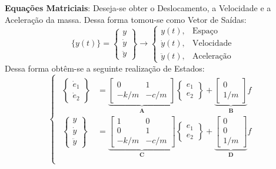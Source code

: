 \documentclass{article}
\begin{document}
\begin{resolution}
    \textbf{Equações Matriciais}: Deseja-se obter o Deslocamento, a Velocidade e a Aceleração da massa. Dessa forma tomou-se como Vetor de Saídas:
    \begin{equation*}
        \lbrace y(t) \rbrace = \begin{Bmatrix} y\\ \dot{y}\\ \ddot{y} \end{Bmatrix} 
        \to \begin{cases} y(t), &\text{Espaço}\\ \dot{y}(t),&\text{Velocidade}\\ \ddot{y}(t),&\text{Aceleração} \end{cases}
    \end{equation*}
    Dessa forma obtêm-se a seguinte realização de Estados:
    \begin{equation}
        \begin{cases}
        \begin{aligned}
            \begin{Bmatrix} \dot{e}_{1}\\ \dot{e}_{2} \end{Bmatrix} &=
            \underbrace{\begin{bmatrix} 0 & 1\\ -k/m & -c/m\end{bmatrix}}_{\mathbf{A}} \begin{Bmatrix} e_{1}\\ e_{2} \end{Bmatrix} + 
            \underbrace{\begin{bmatrix} 0\\ 1/m \end{bmatrix}}_{\mathbf{B}} f\\
            \begin{Bmatrix} y\\ \dot{y}\\ \ddot{y} \end{Bmatrix} &=
            \underbrace{\begin{bmatrix} 1 & 0\\ 0 & 1\\ -k/m & -c/m\end{bmatrix}}_{\mathbf{C}} \begin{Bmatrix} e_{1}\\ e_{2} \end{Bmatrix} + 
            \underbrace{\begin{bmatrix} 0\\ 0\\ 1/m \end{bmatrix}}_{\mathbf{D}} f\\
        \end{aligned}
        \end{cases}
        \end{equation}
\end{resolution}
\end{document}
